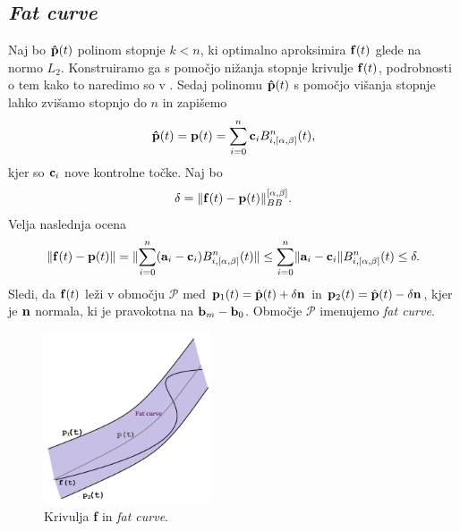 
\subsection{\em Fat curve}
Naj bo ${\bf \hat{p}}(t)$ polinom stopnje $k < n$, ki optimalno aproksimira ${\bf f}(t)$ glede na normo $L_2$. Konstruiramo ga s pomočjo nižanja stopnje krivulje ${\bf f}(t)$, podrobnosti o tem kako to naredimo so v \cite{ls_sq}. Sedaj polinomu ${\bf \hat{p}}(t)$ s pomočjo višanja stopnje lahko zvišamo stopnjo do $n$ in zapišemo
$$
{\bf \hat{p}}(t) = {\bf p}(t) = \sum _{i=0}^n {\bf c}_iB_{i,[\alpha,\beta]}^n(t),
$$
kjer so ${\bf c}_i$ nove kontrolne točke. Naj bo 
\begin{equation}\label{def_delta}
\delta = \lVert {\bf f}(t) - {\bf p}(t) \rVert _{BB}^{[\alpha,\beta]}.
\end{equation}
Velja naslednja ocena
$$
\lVert {\bf f}(t) - {\bf p}(t) \rVert = \lVert \sum _{i=0}^n({\bf a}_i-{\bf c}_i)B_{i,[\alpha,\beta]}^n(t) \rVert
\leq \sum _{i=0}^n\lVert{\bf a}_i-{\bf c}_i\rVert B_{i,[\alpha,\beta]}^n(t) \leq \delta.
$$
Sledi, da ${\bf f}(t)$ leži v območju $\mathcal{P}$ med ${\bf p}_1(t) = \hat{{\bf p}}(t) + \delta {\bf n}$ in ${\bf p}_2(t) = \hat{{\bf p}}(t) - \delta {\bf n}$, kjer je ${\bf n}$ normala, ki je pravokotna na ${\bf b}_m - {\bf b}_0$. Območje $\mathcal{P}$ imenujemo {\em fat curve}.
\begin{figure}[!h]
    \centering 
    \includegraphics[width=0.44\textwidth]{fat_curve_color}
    \caption{Krivulja {\bf f} in {\em fat curve}.}
  	\label{slika3}
\end{figure}